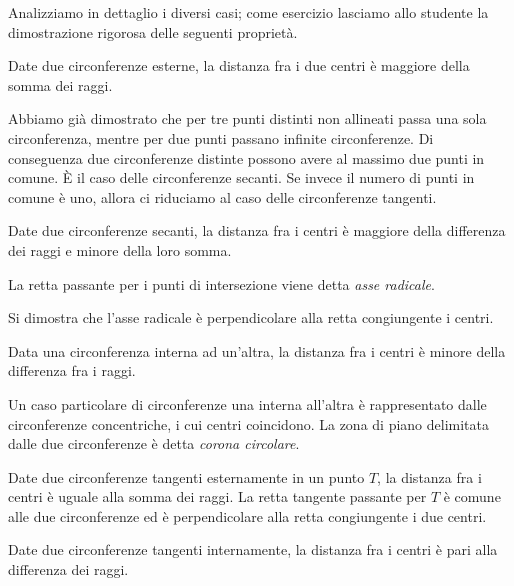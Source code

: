 Analizziamo in dettaglio i diversi casi; come esercizio lasciamo allo studente la dimostrazione rigorosa delle seguenti proprietà.

\begin{teorema}
Date due circonferenze esterne, la distanza fra i due centri è maggiore della somma dei raggi.
\end{teorema}


Abbiamo già dimostrato che per tre punti distinti non allineati passa una sola circonferenza, mentre per due punti passano infinite circonferenze. Di conseguenza due circonferenze distinte possono avere al massimo due punti in comune. \`E il caso delle circonferenze secanti. Se invece il numero di punti in comune è uno, allora ci riduciamo al caso delle circonferenze tangenti.

\begin{teorema}
Date due circonferenze secanti, la distanza fra i centri è maggiore della differenza dei raggi e minore della loro somma.
\end{teorema}


La retta passante per i punti di intersezione viene detta \emph{asse radicale}.

Si dimostra che l'asse radicale è perpendicolare alla retta congiungente i centri.

\begin{teorema}
Data una circonferenza interna ad un'altra, la distanza fra i centri è minore della differenza fra i raggi.
\end{teorema}


Un caso particolare di circonferenze una interna all'altra è rappresentato dalle circonferenze concentriche, i cui centri coincidono. La zona di piano delimitata dalle due circonferenze è detta \emph{corona circolare}.


\begin{teorema}
Date due circonferenze tangenti esternamente in un punto $T$, la distanza fra i centri è uguale alla somma dei raggi. La retta tangente passante per $T$ è comune alle due circonferenze ed è perpendicolare alla retta congiungente i due centri.
\end{teorema}


\begin{teorema}
Date due circonferenze tangenti internamente, la distanza fra i centri è pari alla differenza dei raggi.
\end{teorema}

